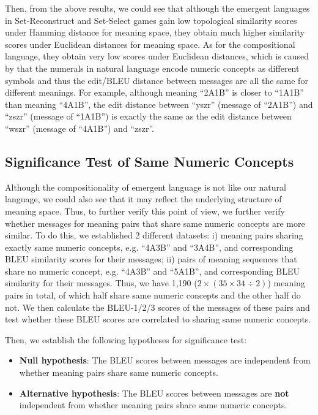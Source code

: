 Then, from the above results, we could see that although the emergent languages in Set-Reconstruct and Set-Select games gain low topological similarity scores under Hamming distance for meaning space, they obtain much higher similarity scores under Euclidean distances for meaning space. As for the compositional language, they obtain very low scores under Euclidean distances, which is caused by that the numerals in natural language encode numeric concepts as different symbols and thus the edit/BLEU distance between messages are all the same for different meanings. For example, although meaning ``2A1B'' is closer to ``1A1B'' than meaning ``4A1B'', the edit distance between ``yszr'' (message of ``2A1B'') and ``zszr'' (message of ``1A1B'') is exactly the same as the edit distance between ``wszr'' (message of ``4A1B'') and ``zszr''.

\subsection{Significance Test of Same Numeric Concepts}
\label{ssec4.2.3:significance_test}

Although the compositionality of emergent language is not like our natural language, we could also see that it may reflect the underlying structure of meaning space. Thus, to further verify this point of view, we further verify whether messages for meaning pairs that share same numeric concepts are more similar. To do this, we established 2 different datasets: i) meaning pairs sharing exactly same numeric concepts, e.g. ``4A3B'' and ``3A4B'', and corresponding BLEU similarity scores for their messages; ii) pairs of meaning sequences that share no numeric concept, e.g. ``4A3B'' and ``5A1B'', and corresponding BLEU similarity for their messages. Thus, we have 1,190 ($2 \times (35 \times 34 \div 2)$) meaning pairs in total, of which half share same numeric concepts and the other half do not. We then calculate the BLEU-1/2/3 scores of the messages of these pairs and test whether these BLEU scores are correlated to sharing same numeric concepts. 

Then, we establish the following hypotheses for significance test:

\begin{itemize}
    \item \textbf{Null hypothesis}: The BLEU scores between messages are independent from whether meaning pairs share same numeric concepts.
    \item \textbf{Alternative hypothesis}: The BLEU scores between messages are \textbf{not} independent from whether meaning pairs share same numeric concepts.
\end{itemize}

